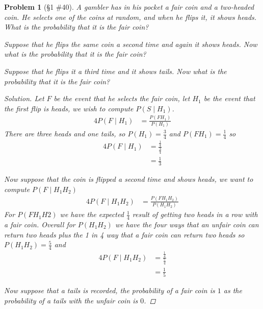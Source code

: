 \documentclass[11pt, oneside]{book}   	%
\newtheorem{problem}{Problem}
\begin{document}
\begin{problem}[\S 1 \#40]
	A gambler has in his pocket a fair coin and a two-headed coin. He selects one of the coins at random, and when he flips it, it shows heads. What is the probability that it is the fair coin? 
	
	Suppose that he flips the same coin a second time and again it shows heads. Now what is the probability that it is the fair coin? 
	
	Suppose that he flips it a third time and it shows tails. Now what is the probability that it is the fair coin? 
	
	\begin{proof}[Solution]
		Let $F$ be the event that he selects the fair coin, let $H_1$ be the event that the first flip is heads, we wish to compute $P(S\mid H_1)$. 
		\begin{alignat*}{4}
			P(F\mid H_1)&=\frac{P(F H_1)}{P(H_1)}
		\end{alignat*}
		There are three heads and one tails, so $P(H_1)=\frac{3}{4}$ and $P(F H_1)=\frac{1}{4}$ so 
		\begin{alignat*}{4}
			P(F\mid H_1)&=\frac{\frac{1}{4}}{\frac{3}{4}} \\
				&=\frac{1}{3}
		\end{alignat*}
	
		Now suppose that the coin is flipped a second time and shows heads, we want to compute $P(F\mid H_1H_2)$
		\begin{alignat*}{4}
			P(F\mid H_1H_2)&=\frac{P(FH_1H_2)}{P(H_1H_2)}
		\end{alignat*}
		For $P(FH_1H2)$ we have the expected $\frac{1}{4}$ result of getting two heads in a row with a fair coin. Overall for $P(H_1H_2)$ we have the four ways that an unfair coin can return two heads plus the 1 in 4 way that a fair coin can return two heads so $P(H_1H_2)=\frac{5}{4}$ and 
		\begin{alignat*}{4}
			P(F\mid H_1H_2)&=\frac{\frac{1}{4}}{\frac{5}{4}} \\
				&=\frac{1}{5}
		\end{alignat*}
		
		Now suppose that a tails is recorded, the probability of a fair coin is $1$ as the probability of a tails with the unfair coin is $0$. 
	\end{proof}
	
\end{problem}
\end{document}
